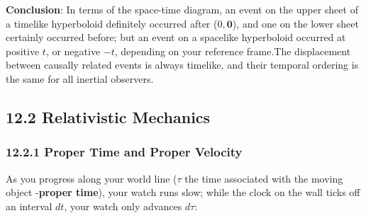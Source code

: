 \documentclass[12pt]{book}
\newcommand{\bm}[1]{\boldsymbol{#1}}
\begin{document}
\begin{enumerate}
\begin{center}
            \end{center}

             \textbf{Conclusion}: In terms of the space-time diagram, an event on the upper sheet of a timelike hyperboloid definitely occurred after (\( 0, \bm{0} \)), and one on the lower sheet certainly occurred before; but an event on a spacelike hyperboloid occurred at positive $t$, or negative $-t$, depending on your reference frame.The displacement between causally related events is always timelike, and their temporal ordering is the same for all inertial observers.
        \end{enumerate}

\subsection{12.2 Relativistic Mechanics}

    \subsubsection{12.2.1 Proper Time and Proper Velocity}      
        As you progress along your world line (\(\tau\) the time associated with the moving object -\textbf{proper time}), your watch runs slow; while the clock on the wall ticks off an interval \(dt\), your watch only advances \(d\tau\):
        
\end{document}
